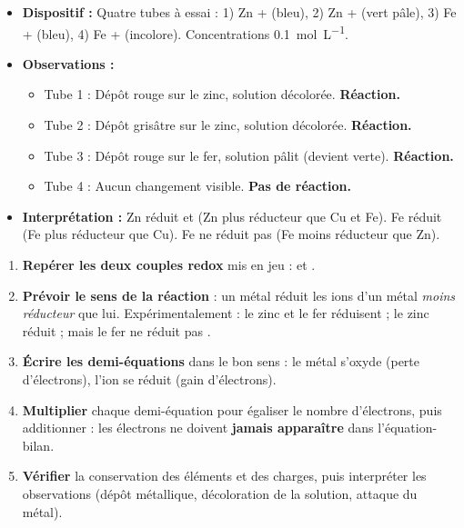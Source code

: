 \documentclass[11pt]{article}
\newcommand{\cle}[1]{{\popxbold\color{popdark}#1}}
\begin{document}
\begin{experience}
\begin{itemize}
\item \textbf{Dispositif :} Quatre tubes à essai : 1) Zn +  (bleu), 2) Zn +  (vert pâle), 3) Fe +  (bleu), 4) Fe +  (incolore). Concentrations \SI{0,1}{mol.L^{-1}}.
\item \textbf{Observations :}
\begin{itemize}
\item Tube 1 : Dépôt rouge sur le zinc, solution décolorée. \textbf{Réaction.}
\item Tube 2 : Dépôt grisâtre sur le zinc, solution décolorée. \textbf{Réaction.}
\item Tube 3 : Dépôt rouge sur le fer, solution pâlit (devient verte). \textbf{Réaction.}
\item Tube 4 : Aucun changement visible. \textbf{Pas de réaction.}
\end{itemize}
\item \textbf{Interprétation :} Zn réduit  et  (Zn plus réducteur que Cu et Fe). Fe réduit  (Fe plus réducteur que Cu). Fe ne réduit pas  (Fe moins réducteur que Zn).
\end{itemize}
\end{experience}

\begin{methode}
\begin{enumerate}
\item \textbf{Repérer les deux couples redox} mis en jeu :  et .
\item \textbf{Prévoir le sens de la réaction} : un métal \cle{réduit} les ions d'un métal \emph{moins réducteur} que lui. Expérimentalement : le zinc et le fer réduisent  ; le zinc réduit  ; mais le fer ne réduit pas .
\item \textbf{Écrire les demi-équations} dans le bon sens : le métal s'oxyde (perte d'électrons), l'ion se réduit (gain d'électrons).
\item \textbf{Multiplier} chaque demi-équation pour égaliser le nombre d'électrons, puis additionner : les électrons ne doivent \textbf{jamais apparaître} dans l'équation-bilan.
\item \textbf{Vérifier} la conservation des éléments et des charges, puis interpréter les observations (dépôt métallique, décoloration de la solution, attaque du métal).
\end{enumerate}
\end{methode}
\end{document}
